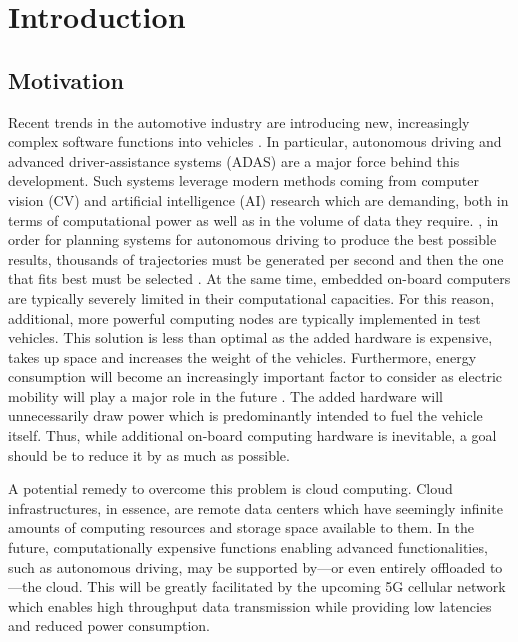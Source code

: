 
\chapter{Introduction}\label{chapter:introduction}


\section{Motivation}
Recent trends in the automotive industry are introducing new, increasingly complex software functions into vehicles \cite{broy2006challenges}. In particular, autonomous driving and advanced driver-assistance systems (ADAS) are a major force behind this development. Such systems leverage modern methods coming from computer vision (CV) and artificial intelligence (AI) research which are demanding, both in terms of computational power as well as in the volume of data they require. \Eg , in order for planning systems for autonomous driving to produce the best possible results, thousands of trajectories must be generated per second and then the one that fits best must be selected \cite{levinson2011towards}. At the same time, embedded on-board computers are typically severely limited in their computational capacities. For this reason, additional, more powerful computing nodes are typically implemented in test vehicles.  This solution is less than optimal as the added hardware is expensive, takes up space and increases the weight of the vehicles. Furthermore, energy consumption will become an increasingly important factor to consider as electric mobility will play a major role in the future  . The added hardware will unnecessarily draw power which is predominantly intended to fuel the vehicle itself. Thus, while additional on-board computing hardware is inevitable, a goal should be to reduce it by as much as possible. 

A potential remedy to overcome this problem is cloud computing. Cloud infrastructures, in essence, are remote data centers which have seemingly infinite amounts of computing resources and storage space available to them. In the future, computationally expensive functions enabling advanced functionalities, such as autonomous driving, may be supported by---or even entirely offloaded to---the cloud. This will be greatly facilitated by the upcoming 5G cellular network which enables high throughput data transmission while providing low latencies and reduced power consumption.

